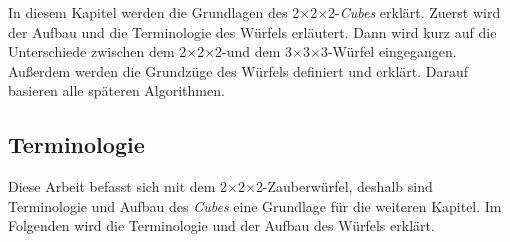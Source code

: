 \documentclass[12pt,a4paper, usenames, dvipsnames]{article}
\newcommand{\Ttwo}{2$\times$2$\times$2-}
\newcommand{\Tthree}{3$\times$3$\times$3-}
\begin{document}
In diesem Kapitel werden die Grundlagen des \Ttwo \textit{Cubes} erklärt. Zuerst wird der Aufbau und die Terminologie des Würfels erläutert. Dann wird kurz auf die Unterschiede zwischen dem \Ttwo und dem \Tthree Würfel eingegangen. 
Außerdem werden die Grundzüge des Würfels definiert und erklärt. Darauf basieren alle späteren Algorithmen. 


%
%
%
%
%
%
%
%
%
%
\subsection*{Terminologie} 

Diese Arbeit befasst sich mit dem \Ttwo Zauberwürfel, deshalb sind Terminologie und Aufbau des \textit{Cubes} eine Grundlage für die weiteren Kapitel.
Im Folgenden wird die Terminologie und der Aufbau des Würfels erklärt.
\end{document}
